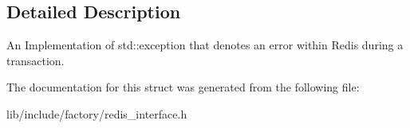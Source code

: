 \subsection{Detailed Description}
An Implementation of std\-::exception that denotes an error within Redis during a transaction. 

The documentation for this struct was generated from the following file\-:\begin{DoxyCompactItemize}
\item 
lib/include/factory/redis\-\_\-interface.\-h\end{DoxyCompactItemize}
